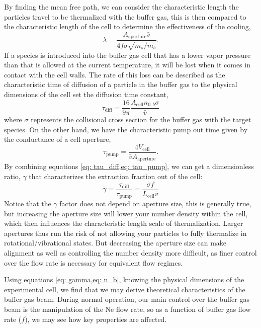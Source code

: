 By finding the mean free path, we can consider the characteristic length the particles travel to be thermalized with the buffer gas, this is then compared to the characteristic length of the cell to determine the effectiveness of the cooling,
\begin{equation*}
	\lambda = \frac{A_{\mathrm{aperture}} \bar{v}}{4 f \sigma \sqrt{m_s/m_b}}.
\end{equation*}
If a species is introduced into the buffer gas cell that has a lower vapor pressure than that is allowed at the current temperature, it will be lost when it comes in contact with the cell walls. The rate of this loss can be described as the characteristic time of diffusion of a particle in the buffer gas to the physical dimensions of the cell set the diffusion time constant,
\begin{equation}
	\tau_{\mathrm{diff}} = \frac{16}{9 \pi} \frac{A_{\mathrm{cell}} n_{0,b} \sigma}{\bar{v}} \label{eq: tau_diff}
\end{equation}
where $\sigma$ represents the collisional cross section for the buffer gas with the target species. On the other hand, we have the characteristic pump out time given by the conductance of a cell aperture,
\begin{equation}
	\tau_{\mathrm{pump}}=\frac{4V_{\mathrm{cell}}}{\bar{v}A_{\mathrm{aperture}}}. \label{eq: tau_pump}
\end{equation}
By combining equations \cref{eq: tau_diff,eq: tau_pump}, we can get a dimensionless ratio, $\gamma$ that characterizes the extraction fraction out of the cell:
\begin{equation}
	\gamma = \frac{\tau_{\mathrm{diff}}}{\tau_{\mathrm{pump}}} = \frac{\sigma f}{L_{\mathrm{cell}} \bar{v}} \label{eq: gamma}
\end{equation}
Notice that the $\gamma$ factor does not depend on aperture size, this is generally true, but increasing the aperture size will lower your number density within the cell, which then influences the characteristic length scale of thermalization. Larger apertures thus run the risk of not allowing your particles to fully thermalize in rotational/vibrational states. But decreasing the aperture size can make alignment as well as controlling the number density more difficult, as finer control over the flow rate is necessary for equivalent flow regimes.

Using equations \cref{eq: gamma,eq: n_b}, knowing the physical dimensions of the experimental cell, we find that we may derive theoretical characteristics of the buffer gas beam. During normal operation, our main control over the buffer gas beam is the manipulation of the Ne flow rate, so as a function of buffer gas flow rate ($f$), we may see how key properties are affected.

